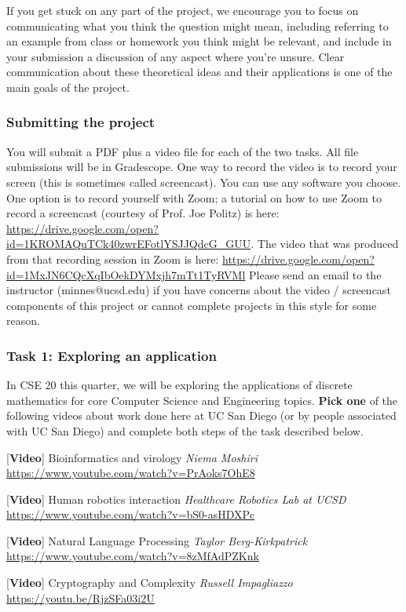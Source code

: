If you get stuck on any part of the project, we encourage you to focus on communicating what you think 
the question might mean, including referring to an example from class or homework you think might be relevant, 
and include in your submission a discussion of any aspect where you're unsure. Clear communication about these
theoretical ideas and their applications is one of the main goals of the project.

\subsubsection*{Submitting the project} You will submit a PDF plus a video file for each of the 
two tasks. All file submissions will be in Gradescope. 
One way to record the video is to record your screen (this is sometimes called screencast).
You can use any software you choose. 
One option is to record yourself with Zoom; a tutorial on how to use Zoom to record a 
screencast (courtesy of Prof. Joe Politz)  is here: 
\url{https://drive.google.com/open?id=1KROMAQuTCk40zwrEFotlYSJJQdcG_GUU}.
The video that was produced from that recording session in Zoom is here:
\url{https://drive.google.com/open?id=1MxJN6CQcXqIbOekDYMxjh7mTt1TyRVMl}
Please send an email to the instructor (minnes@ucsd.edu) if you have 
concerns about  the video / screencast components of this project or cannot 
complete projects in this style for some reason.

\subsubsection*{Task 1: Exploring an application}
In CSE 20 this quarter, we will be exploring the applications of discrete mathematics for core Computer
Science and Engineering topics. {\bf Pick one} of the following videos about work done 
here at UC San Diego (or by people associated with UC San Diego) and complete both steps of 
the task described below.


[{\bf Video}] Bioinformatics and virology {\it Niema Moshiri}
{\small \url{https://www.youtube.com/watch?v=PrAoks7OhE8}}

[{\bf Video}] Human robotics interaction {\it Healthcare Robotics Lab at UCSD}
{\small \url{https://www.youtube.com/watch?v=bS0-asHDXPc}}

[{\bf Video}] Natural Language Processing {\it Taylor Berg-Kirkpatrick}
{\small \url{https://www.youtube.com/watch?v=8zMfAdPZKnk}}

[{\bf Video}] Cryptography and Complexity {\it Russell Impagliazzo}
{\small \url{https://youtu.be/RjzSFa03i2U}}

